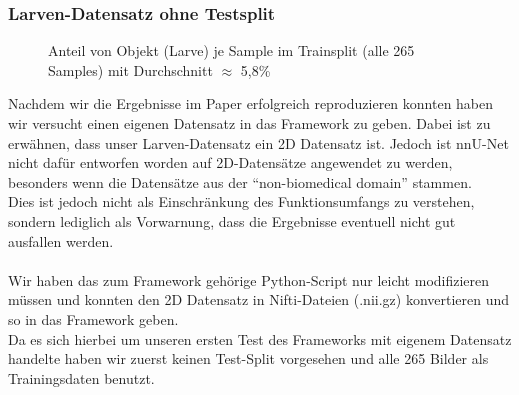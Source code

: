 \subsubsection{Larven-Datensatz ohne Testsplit}
\begin{figure}[H]
\centering

\caption{Anteil von Objekt (Larve) je Sample im Trainsplit (alle 265 Samples) mit Durchschnitt $\approx$ 5,8\%}
\label{pic:Haeuf_200}
\end{figure}
Nachdem wir die Ergebnisse im Paper erfolgreich reproduzieren konnten haben wir versucht einen eigenen Datensatz in das Framework zu geben. Dabei ist zu erwähnen, dass unser Larven-Datensatz \cite{larven} ein 2D Datensatz ist. Jedoch ist nnU-Net nicht dafür entworfen worden auf 2D-Datensätze angewendet zu werden, besonders wenn die Datensätze aus der \enquote{non-biomedical domain} \cite{nnunetGithub2D-Daten} stammen.\\
Dies ist jedoch nicht als Einschränkung des Funktionsumfangs zu verstehen, sondern lediglich als Vorwarnung, dass die Ergebnisse eventuell nicht gut ausfallen werden.\\\\
Wir haben das zum Framework gehörige Python-Script \cite{nnunetGithub2D-Pythonscript} nur leicht modifizieren müssen und konnten den 2D Datensatz in Nifti-Dateien (.nii.gz) konvertieren und so in das Framework geben.\\
Da es sich hierbei um unseren ersten Test des Frameworks mit eigenem Datensatz handelte haben wir zuerst keinen Test-Split vorgesehen und alle 265 Bilder als Trainingsdaten benutzt.
